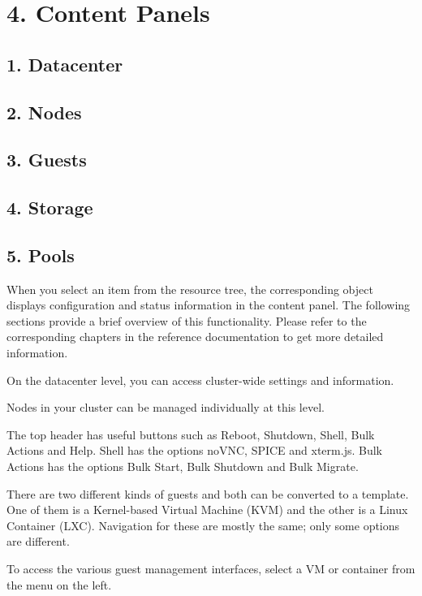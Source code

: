 \section{4. Content Panels}

\subsection{1. Datacenter}

\subsection{2. Nodes}

\subsection{3. Guests}

\subsection{4. Storage}

\subsection{5. Pools}

When you select an item from the resource tree, the corresponding object displays configuration and status information in the content panel. The following sections provide a brief overview of this functionality. Please refer to the corresponding chapters in the reference documentation to get more detailed information.

On the datacenter level, you can access cluster-wide settings and information.

Nodes in your cluster can be managed individually at this level.

The top header has useful buttons such as Reboot, Shutdown, Shell, Bulk Actions and Help. Shell has the options noVNC, SPICE and xterm.js. Bulk Actions has the options Bulk Start, Bulk Shutdown and Bulk Migrate.

There are two different kinds of guests and both can be converted to a template. One of them is a Kernel-based Virtual Machine (KVM) and the other is a Linux Container (LXC). Navigation for these are mostly the same; only some options are different.

To access the various guest management interfaces, select a VM or container from the menu on the left.

